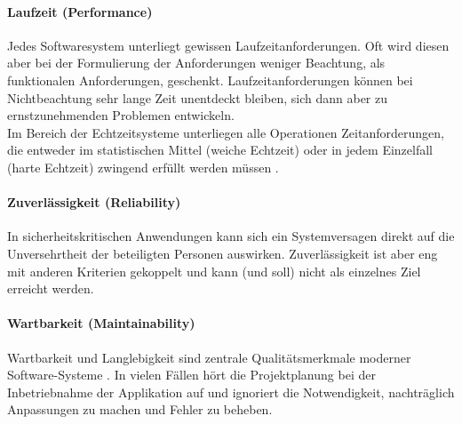 \paragraph{Laufzeit (Performance)} Jedes Softwaresystem unterliegt gewissen Laufzeitanforderungen. Oft wird diesen aber bei der Formulierung der Anforderungen weniger Beachtung, als funktionalen Anforderungen, geschenkt. Laufzeitanforderungen können bei Nichtbeachtung sehr lange Zeit unentdeckt bleiben, sich dann aber zu ernstzunehmenden Problemen entwickeln.\\
Im Bereich der Echtzeitsysteme unterliegen alle Operationen Zeitanforderungen, die entweder im statistischen Mittel (weiche Echtzeit) oder in jedem Einzelfall (harte Echtzeit) zwingend erfüllt werden müssen \cite{hoffmann_software-qualitat_2013}. 

\paragraph{Zuverlässigkeit (Reliability)} In sicherheitskritischen Anwendungen kann sich ein Systemversagen direkt auf die Unversehrtheit der beteiligten Personen auswirken. Zuverlässigkeit ist aber eng mit anderen Kriterien gekoppelt und kann (und soll) nicht als einzelnes Ziel erreicht werden.

\paragraph{Wartbarkeit (Maintainability)} Wartbarkeit und Langlebigkeit sind zentrale Qualitätsmerkmale moderner Software-Systeme \cite{rombach_design_2009}. In vielen Fällen hört die Projektplanung bei der Inbetriebnahme der Applikation auf und ignoriert die Notwendigkeit, nachträglich Anpassungen zu machen und Fehler zu beheben.

